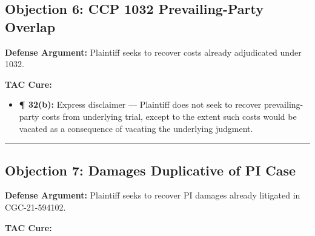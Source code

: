 \subsection{Objection 6: CCP \textsection{} 1032 Prevailing-Party Overlap}\label{objection-6-ccp-1032-prevailing-party-overlap}

\textbf{Defense Argument:} Plaintiff seeks to recover costs already adjudicated under \textsection{} 1032.

\textbf{TAC Cure:}

\begin{itemize}
\tightlist
\item
  \textbf{¶ 32(b):} Express disclaimer --- Plaintiff does not seek to recover prevailing-party costs from underlying trial, except to the extent such costs would be vacated as a consequence of vacating the underlying judgment.
\end{itemize}

\begin{center}\rule{0.5\linewidth}{0.5pt}\end{center}

\subsection{Objection 7: Damages Duplicative of PI Case}\label{objection-7-damages-duplicative-of-pi-case}

\textbf{Defense Argument:} Plaintiff seeks to recover PI damages already litigated in CGC-21-594102.

\textbf{TAC Cure:}

